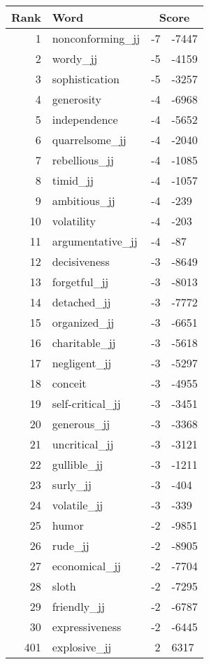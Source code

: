 \begin{longtable}[!htbp]{| rlr@{.}l |}
    \hline
    \textbf{Rank} & \textbf{Word} & \multicolumn{2}{c|}{\textbf{Score}} \\
    \hline
    \endhead
    1 & nonconforming\_jj & -7 & -7447 \\
    2 & wordy\_jj & -5 & -4159 \\
    3 & sophistication & -5 & -3257 \\
    4 & generosity & -4 & -6968 \\
    5 & independence & -4 & -5652 \\
    6 & quarrelsome\_jj & -4 & -2040 \\
    7 & rebellious\_jj & -4 & -1085 \\
    8 & timid\_jj & -4 & -1057 \\
    9 & ambitious\_jj & -4 & -239 \\
    10 & volatility & -4 & -203 \\
    11 & argumentative\_jj & -4 & -87 \\
    12 & decisiveness & -3 & -8649 \\
    13 & forgetful\_jj & -3 & -8013 \\
    14 & detached\_jj & -3 & -7772 \\
    15 & organized\_jj & -3 & -6651 \\
    16 & charitable\_jj & -3 & -5618 \\
    17 & negligent\_jj & -3 & -5297 \\
    18 & conceit & -3 & -4955 \\
    19 & self-critical\_jj & -3 & -3451 \\
    20 & generous\_jj & -3 & -3368 \\
    21 & uncritical\_jj & -3 & -3121 \\
    22 & gullible\_jj & -3 & -1211 \\
    23 & surly\_jj & -3 & -404 \\
    24 & volatile\_jj & -3 & -339 \\
    25 & humor & -2 & -9851 \\
    26 & rude\_jj & -2 & -8905 \\
    27 & economical\_jj & -2 & -7704 \\
    28 & sloth & -2 & -7295 \\
    29 & friendly\_jj & -2 & -6787 \\
    30 & expressiveness & -2 & -6445 \\
    401 & explosive\_jj & 2 & 6317 \\

\end{longtable}
